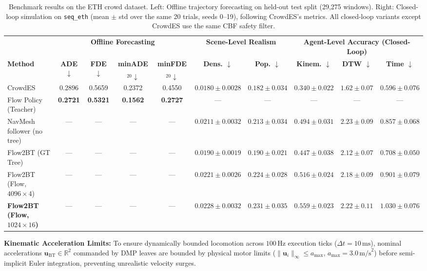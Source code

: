 \documentclass{sice-si}
\begin{document}
\begin{table}[t]
\centering
\caption{Benchmark results on the ETH crowd dataset. Left: Offline trajectory forecasting on held-out test split (29,275 windows). Right: Closed-loop simulation on \texttt{seq\_eth} (mean $\pm$ std over the same 20 trials, seeds 0--19), following CrowdES's metrics. All closed-loop variants except CrowdES use the same CBF safety filter.}
\label{tab:benchmark}
\footnotesize
\setlength{\tabcolsep}{2.5pt}
\begin{tabular}{lcccc|cc|ccc}
\hline
& \multicolumn{4}{c|}{\textbf{Offline Forecasting}} & \multicolumn{2}{c|}{\textbf{Scene-Level Realism}} & \multicolumn{3}{c}{\textbf{Agent-Level Accuracy (Closed-Loop)}} \\
\textbf{Method} & \textbf{ADE $\downarrow$} & \textbf{FDE $\downarrow$} & \textbf{minADE$_{20} \downarrow$} & \textbf{minFDE$_{20} \downarrow$} & \textbf{Dens. $\downarrow$} & \textbf{Pop. $\downarrow$} & \textbf{Kinem. $\downarrow$} & \textbf{DTW $\downarrow$} & \textbf{Time $\downarrow$} \\
\hline
CrowdES~\cite{bae2025crowdes} & 0.2896 & 0.5659 & 0.2372 & 0.4550 & $\mathbf{0.0180} \pm 0.0028$ & $\mathbf{0.182} \pm 0.034$ & $\mathbf{0.340} \pm 0.022$ & $\mathbf{1.62} \pm 0.07$ & $\mathbf{0.596} \pm 0.076$ \\
Flow Policy (Teacher) & \textbf{0.2721} & \textbf{0.5321} & \textbf{0.1562} & \textbf{0.2727} & — & — & — & — & — \\
\hline
NavMesh follower (no tree) & — & — & — & — & $0.0211 \pm 0.0032$ & $0.213 \pm 0.034$ & $0.494 \pm 0.031$ & $2.23 \pm 0.09$ & $0.857 \pm 0.068$ \\
Flow2BT (GT Tree) & — & — & — & — & $0.0190 \pm 0.0019$ & $0.190 \pm 0.021$ & $0.447 \pm 0.038$ & $2.12 \pm 0.07$ & $0.708 \pm 0.050$ \\
Flow2BT (Flow, $4096 \times 4$) & — & — & — & — & $0.0221 \pm 0.0026$ & $0.224 \pm 0.028$ & $0.516 \pm 0.024$ & $2.18 \pm 0.09$ & $0.901 \pm 0.079$ \\
\textbf{Flow2BT (Flow, $1024 \times 16$)} & — & — & — & — & $0.0228 \pm 0.0032$ & $0.231 \pm 0.035$ & $0.559 \pm 0.023$ & $2.22 \pm 0.11$ & $1.030 \pm 0.076$ \\
\hline
\end{tabular}
\end{table}

\textbf{Kinematic Acceleration Limits:}
To ensure dynamically bounded locomotion across $100\,\text{Hz}$ execution ticks ($\Delta t = 10\,\text{ms}$), nominal accelerations $\mathbf{u}_{\text{BT}} \in \mathbb{R}^2$ commanded by DMP leaves are bounded by physical motor limits ($\|\mathbf{u}_i\|_\infty \le a_{\max}$, $a_{\max} = 3.0\,\text{m/s}^2$) before semi-implicit Euler integration, preventing unrealistic velocity surges.
\end{document}
